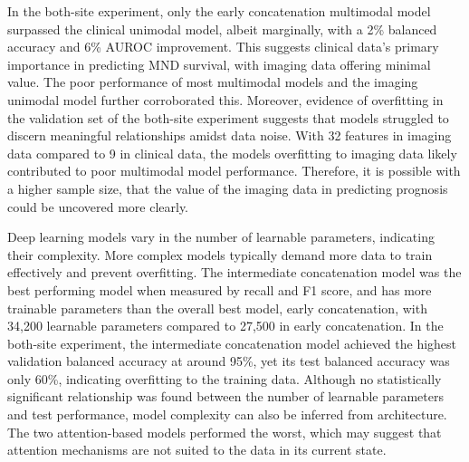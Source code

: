 In the both-site experiment, only the early concatenation multimodal model surpassed the clinical unimodal model, albeit marginally, with a 2\% balanced accuracy and 6\% AUROC improvement.
This suggests clinical data's primary importance in predicting MND survival, with imaging data offering minimal value.
The poor performance of most multimodal models and the imaging unimodal model further corroborated this.
Moreover, evidence of overfitting in the validation set of the both-site experiment suggests that models struggled to discern meaningful relationships amidst data noise.
With 32 features in imaging data compared to 9 in clinical data, the models overfitting to imaging data likely contributed to poor multimodal model performance.
Therefore, it is possible with a higher sample size, that the value of the imaging data in predicting prognosis could be uncovered more clearly.


Deep learning models vary in the number of learnable parameters, indicating their complexity.
More complex models typically demand more data to train effectively and prevent overfitting.
The intermediate concatenation model was the best performing model when measured by recall and F1 score, and has more trainable parameters than the overall best model, early concatenation, with 34,200 learnable parameters compared to 27,500 in early concatenation.
In the both-site experiment, the intermediate concatenation model achieved the highest validation balanced accuracy at around 95\%, yet its test balanced accuracy was only 60\%, indicating overfitting to the training data.
Although no statistically significant relationship was found between the number of learnable parameters and test performance, model complexity can also be inferred from architecture.
The two attention-based models performed the worst, which may suggest that attention mechanisms are not suited to the data in its current state.


